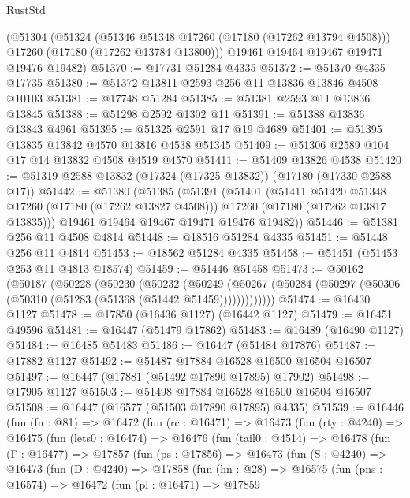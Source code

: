 \begin{lexlean}{RustStd}
\begin{coremodule}
    (@51304
      (@51324
        (@51346 @51348 @17260 (@17180 (@17262 @13794 @4508)))
        @17260
        (@17180 (@17262 @13784 @13800)))
      @19461
      @19464
      @19467
      @19471
      @19476
      @19482)
@51370 := @17731 @51284 @4335
@51372 := @51370 @4335 @17735
@51380 := @51372 @13811 @2593 @256 @11 @13836 @13846 @4508 @10103
@51381 := @17748 @51284
@51385 := @51381 @2593 @11 @13836 @13845
@51388 := @51298 @2592 @1302 @11
@51391 := @51388 @13836 @13843 @4961
@51395 := @51325 @2591 @17 @19 @4689
@51401 := @51395 @13835 @13842 @4570 @13816 @4538 @51345
@51409 := @51306 @2589 @104 @17 @14 @13832 @4508 @4519 @4570
@51411 := @51409 @13826 @4538
@51420 := @51319 @2588 @13832 (@17324 (@17325 @13832)) (@17180 (@17330 @2588 @17))
@51442 := @51380
    (@51385
      (@51391
        (@51401
          (@51411 @51420 @51348 @17260 (@17180 (@17262 @13827 @4508)))
          @17260
          (@17180 (@17262 @13817 @13835)))
        @19461
        @19464
        @19467
        @19471
        @19476
        @19482))
@51446 := @51381 @256 @11 @4508 @4814
@51448 := @18516 @51284 @4335
@51451 := @51448 @256 @11 @4814
@51453 := @18562 @51284 @4335
@51458 := @51451 (@51453 @253 @11 @4813 @18574)
@51459 := @51446 @51458
@51473 := @50162
    (@50187
      (@50228
        (@50230
          (@50232
            (@50249
              (@50267 (@50284 (@50297 (@50306 (@50310 (@51283 (@51368 (@51442 @51459)))))))))))))
@51474 := @16430 @1127
@51478 := @17850 (@16436 @1127) (@16442 @1127)
@51479 := @16451 @49596
@51481 := @16447 (@51479 @17862)
@51483 := @16489 (@16490 @1127)
@51484 := @16485 @51483
@51486 := @16447 (@51484 @17876)
@51487 := @17882 @1127
@51492 := @51487 @17884 @16528 @16500 @16504 @16507
@51497 := @16447 (@17881 (@51492 @17890 @17895) @17902)
@51498 := @17905 @1127
@51503 := @51498 @17884 @16528 @16500 @16504 @16507
@51508 := @16447 (@16577 (@51503 @17890 @17895) @4335)
@51539 := @16446
    (fun (fn : @81) =>
    @16472
      (fun (rc : @16471) =>
      @16473
        (fun (rty : @4240) =>
        @16475
          (fun (lets0 : @16474) =>
          @16476
            (fun (tail0 : @4514) =>
            @16478
              (fun (Γ : @16477) =>
              @17857
                (fun (ps : @17856) =>
                @16473
                  (fun (S : @4240) =>
                  @16473
                    (fun (D : @4240) =>
                    @17858
                      (fun (hn : @28) =>
                      @16575
                        (fun (pns : @16574) =>
                        @16472
                          (fun (pl : @16471) =>
                          @17859

\end{coremodule}
\end{lexlean}
